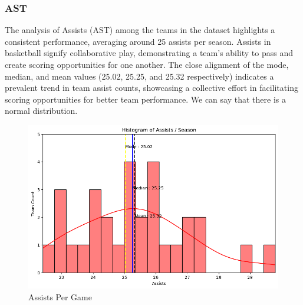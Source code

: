 \documentclass[conference]{IEEEtran}
\begin{document}
\subsubsection{AST}
The analysis of Assists (AST) among the teams in the dataset highlights a consistent performance, averaging around 25 assists per season. Assists in basketball signify collaborative play, demonstrating a team's ability to pass and create scoring opportunities for one another. The close alignment of the mode, median, and mean values (25.02, 25.25, and 25.32 respectively) indicates a prevalent trend in team assist counts, showcasing a collective effort in facilitating scoring opportunities for better team performance. We can say that there is a normal distribution.

\begin{figure}[h]
    \centering
    \includegraphics[scale=0.41]{AST_image.png}
    \caption{Assists Per Game }
    \label{fig:enter-label}
\end{figure}
\vspace{\baselineskip}
\end{document}
